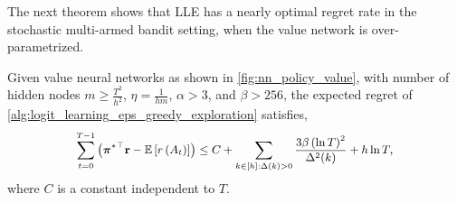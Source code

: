 The next theorem shows that LLE has a nearly optimal regret rate in the stochastic multi-armed bandit setting, when the value network is over-parametrized.
\begin{thm}
\label{thm:logit_learning_main_result}
    Given value neural networks as shown in \cref{fig:nn_policy_value}, with number of hidden nodes $m \ge \frac{T^2}{h^2}$, $\eta = \frac{1}{h m}$,  $\alpha > 3$, and $\beta > 256$, the expected regret of \cref{alg:logit_learning_eps_greedy_exploration} satisfies,
\begin{equation*}
\small
\begin{split}
    \sum\limits_{t=0}^{T-1}{ \left( {\rvpi^*}^\top \rvr - \sE \left[ r\left(A_t\right) \right] \right)}  \le C + \sum\limits_{k \in [h] : \Delta(k) > 0}{ \frac{ 3 \beta \left( \ln{T} \right)^2}{\Delta^2(k)} }  + h \ln{T},
\end{split}
\end{equation*}
where $C$ is a constant independent to $T$.
\end{thm}

